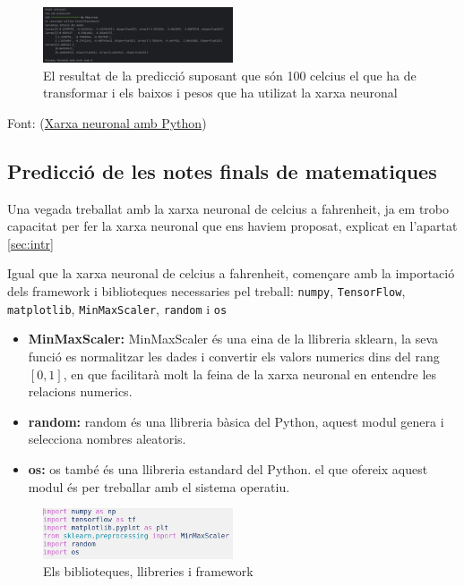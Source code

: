 \begin{figure}[H]
    \centering
    \includegraphics[width=0.5\textwidth]{./figures/13.png}
    \caption{El resultat de la predicció suposant que són 100 celcius el que ha de transformar i els baixos i pesos que ha utilizat la xarxa neuronal}
\end{figure}


Font: (\href{https://www.youtube.com/watch?v=iX_on3VxZzkhttps://www.youtube.com/watch?v=iX_on3VxZzk}{Xarxa neuronal amb Python})

\subsection{Predicció de les notes finals de matematiques }
Una vegada treballat amb la xarxa neuronal de celcius a fahrenheit, ja em trobo capacitat per fer la xarxa neuronal que ens haviem proposat, explicat en l'apartat \ref{sec:intr}

Igual que la xarxa neuronal de celcius a fahrenheit, començare amb la importació dels framework i biblioteques necessaries pel treball: \texttt{numpy}, \texttt{TensorFlow}, \texttt{matplotlib}, \texttt{MinMaxScaler}, \texttt{random} i \texttt{os}

\begin{itemize}
 \item \textbf{MinMaxScaler: } MinMaxScaler és una eina de la llibreria sklearn, la seva funció es normalitzar les dades i convertir els valors numerics dins del rang $[0,1]$, en que facilitarà molt la feina de la xarxa neuronal en entendre les relacions numerics. 
 \item \textbf{random: } random és una llibreria bàsica del Python, aquest modul genera i selecciona nombres aleatoris.
 \item \textbf{os: } os també és una llibreria estandard del Python. el que ofereix aquest modul és per treballar amb el sistema operatiu.
\end{itemize}

\begin{figure}[H]
    \centering
    \includegraphics[width=0.5\textwidth]{./figures/21.png}
    \caption{Els biblioteques, llibreries i framework}
\end{figure}

